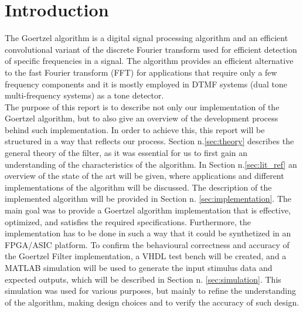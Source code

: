 \section{Introduction}
The Goertzel algorithm is a digital signal processing algorithm and an efficient convolutional variant of the discrete Fourier transform used for efficient detection of specific frequencies in a signal. The algorithm provides an efficient alternative to the fast Fourier transform (FFT) for applications that require only a few frequency components and it is mostly employed in DTMF systems (dual tone multi-frequency systems) as a tone detector.\\
The purpose of this report is to describe not only our implementation  of the Goertzel algorithm, but to also give an overview of the development process behind such implementation. In order to achieve this, this report will be structured in a way that reflects our process. Section n.\ref{sec:theory} describes the general theory of the filter, as it was essential for us to first gain an understanding of the characteristics of the algorithm. In Section n.\ref{sec:lit_ref} an overview of the state of the art will be given, where applications and different implementations of the algorithm will be discussed. The description of the implemented algorithm will be provided in Section n. \ref{sec:implementation}. The main goal was to provide a Goertzel algorithm implementation that is effective, optimized, and satisfies the required specifications. Furthermore, the implementation has to be done in such a way that it could be synthetized in an FPGA/ASIC platform. To confirm the behavioural correctness and accuracy of the Goertzel Filter implementation, a VHDL test bench will be created, and a MATLAB simulation will be used to generate the input stimulus data and expected outputs, which will be described in Section n. \ref{sec:simulation}. This simulation was used for various purposes, but mainly to refine the understanding of the algorithm, making design choices and to verify the accuracy of such design.
